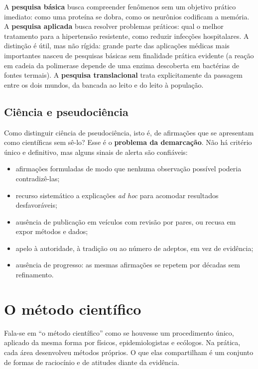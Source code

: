 \documentclass[
]{book}
\providecommand{\tightlist}{%
  \setlength{\itemsep}{0pt}\setlength{\parskip}{0pt}}
\begin{document}
A \textbf{pesquisa básica} busca compreender fenômenos sem um objetivo prático imediato: como uma proteína se dobra, como os neurônios codificam a memória. A \textbf{pesquisa aplicada} busca resolver problemas práticos: qual o melhor tratamento para a hipertensão resistente, como reduzir infecções hospitalares. A distinção é útil, mas não rígida: grande parte das aplicações médicas mais importantes nasceu de pesquisas básicas sem finalidade prática evidente (a reação em cadeia da polimerase depende de uma enzima descoberta em bactérias de fontes termais). A \textbf{pesquisa translacional} trata explicitamente da passagem entre os dois mundos, da bancada ao leito e do leito à população.

\subsection{Ciência e pseudociência}\label{ciuxeancia-e-pseudociuxeancia}

Como distinguir ciência de pseudociência, isto é, de afirmações que se apresentam como científicas sem sê-lo? Esse é o \textbf{problema da demarcação}. Não há critério único e definitivo, mas alguns sinais de alerta são confiáveis:

\begin{itemize}
\tightlist
\item
  afirmações formuladas de modo que nenhuma observação possível poderia contradizê-las;
\item
  recurso sistemático a explicações \emph{ad hoc} para acomodar resultados desfavoráveis;
\item
  ausência de publicação em veículos com revisão por pares, ou recusa em expor métodos e dados;
\item
  apelo à autoridade, à tradição ou ao número de adeptos, em vez de evidência;
\item
  ausência de progresso: as mesmas afirmações se repetem por décadas sem refinamento.
\end{itemize}

\section{O método científico}\label{o-muxe9todo-cientuxedfico}

Fala-se em ``o método científico'' como se houvesse um procedimento único, aplicado da mesma forma por físicos, epidemiologistas e ecólogos. Na prática, cada área desenvolveu métodos próprios. O que elas compartilham é um conjunto de formas de raciocínio e de atitudes diante da evidência.
\end{document}
